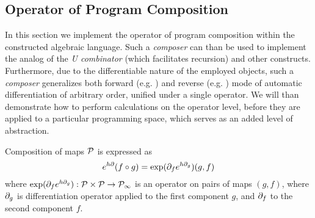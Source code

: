 


\subsection{Operator of Program Composition}\label{sec:compsition}

In this section we implement the operator of program composition within the constructed algebraic language. Such a \emph{composer} can than be used to implement the analog of the \emph{U combinator} (which facilitates recursion) and other constructs. Furthermore, due to the differentiable nature of the employed objects, such a \emph{composer} generalizes both forward (e.g. \cite{PcAD}) and reverse (e.g. \cite{ReverseAD}) mode of
 automatic differentiation of arbitrary order, unified under a single operator. We will than demonstrate how to perform calculations on the operator level, before they are applied to a particular programming space, which serves as an added level of abstraction.
 
 \begin{theorem}\label{izr:kompo}
 Composition of maps $\mathcal{P}$ is expressed as
 \begin{equation}\label{eq:kompo}
 e^{h\partial}(f\circ g)=\exp(\partial_fe^{h\partial_g})(g,f)
 \end{equation}
 where $\exp(\partial_fe^{h\partial_g}):\mathcal{P}\times\mathcal{P}\to\mathcal{P}_\infty$ is an operator on pairs
 of maps $(g,f)$, where $\partial_g$ is differentiation operator applied to the first
 component $g$, and $\partial_f$ to the second component $f$. 
 \end{theorem}
 
